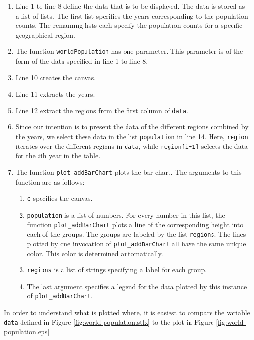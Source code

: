 \begin{enumerate}
\item Line 1 to line 8 define the data that is to be displayed.  The data is stored as a list of
      lists.  The first list specifies the years corresponding to the population counts.
      The remaining lists each specify the population counts for a specific geographical region.
\item The function \texttt{worldPopulation} has one parameter.  This parameter is of the form of the
      data specified in line 1 to line 8.
\item Line 10 creates the canvas.
\item Line 11 extracts the years.
\item Line 12 extract the regions from the first column of \texttt{data}.
\item Since our intention is to present the data of the different regions combined by the years, 
      we select these data in the list \texttt{population} in line 14.  Here, \texttt{region} iterates
      over the different regions in \texttt{data}, while \texttt{region[i+1]} selects the data for the $i$th
      year in the table.
\item The function \texttt{plot\_addBarChart} plots the bar chart. The arguments to this function 
      are as follows:
      \begin{enumerate}
      \item \texttt{c} specifies  the canvas.
      \item \texttt{population} is a list of numbers.  For every number in this list, the function 
            \texttt{plot\_addBarChart} plots a line of the corresponding height into each of the
            groups.  The groups are labeled by the list \texttt{regions}.  The lines plotted by one
            invocation of \texttt{plot\_addBarChart} all have the same unique color.  This color is
            determined automatically.
      \item \texttt{regions} is a list of strings specifying a label for each group.
      \item The last argument specifies a legend for the data plotted by this instance of 
            \texttt{plot\_addBarChart}.
      \end{enumerate}
\end{enumerate}
In order to understand what is plotted where, it is easiest to compare the variable \texttt{data} defined in Figure
\ref{fig:world-population.stlx} to the plot in Figure \ref{fig:world-population.eps}


